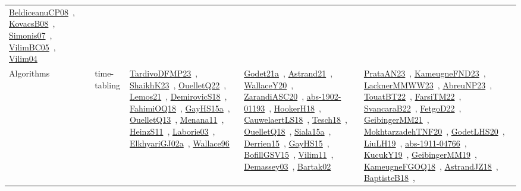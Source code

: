 {\begin{longtable}{lp{3cm}>{\raggedright\arraybackslash}p{6cm}>{\raggedright\arraybackslash}p{6cm}>{\raggedright\arraybackslash}p{8cm}}
\href{works/BeldiceanuCP08.pdf}{BeldiceanuCP08}~\cite{BeldiceanuCP08}, \href{works/KovacsB08.pdf}{KovacsB08}~\cite{KovacsB08}, \href{works/Simonis07.pdf}{Simonis07}~\cite{Simonis07}, \href{works/VilimBC05.pdf}{VilimBC05}~\cite{VilimBC05}, \href{works/Vilim04.pdf}{Vilim04}~\cite{Vilim04}\\
Algorithms & time-tabling & \href{works/TardivoDFMP23.pdf}{TardivoDFMP23}~\cite{TardivoDFMP23}, \href{works/ShaikhK23.pdf}{ShaikhK23}~\cite{ShaikhK23}, \href{works/OuelletQ22.pdf}{OuelletQ22}~\cite{OuelletQ22}, \href{works/Lemos21.pdf}{Lemos21}~\cite{Lemos21}, \href{works/DemirovicS18.pdf}{DemirovicS18}~\cite{DemirovicS18}, \href{works/FahimiOQ18.pdf}{FahimiOQ18}~\cite{FahimiOQ18}, \href{works/GayHS15a.pdf}{GayHS15a}~\cite{GayHS15a}, \href{works/OuelletQ13.pdf}{OuelletQ13}~\cite{OuelletQ13}, \href{works/Menana11.pdf}{Menana11}~\cite{Menana11}, \href{works/HeinzS11.pdf}{HeinzS11}~\cite{HeinzS11}, \href{works/Laborie03.pdf}{Laborie03}~\cite{Laborie03}, \href{works/ElkhyariGJ02a.pdf}{ElkhyariGJ02a}~\cite{ElkhyariGJ02a}, \href{works/Wallace96.pdf}{Wallace96}~\cite{Wallace96} & \href{works/Godet21a.pdf}{Godet21a}~\cite{Godet21a}, \href{works/Astrand21.pdf}{Astrand21}~\cite{Astrand21}, \href{works/WallaceY20.pdf}{WallaceY20}~\cite{WallaceY20}, \href{works/ZarandiASC20.pdf}{ZarandiASC20}~\cite{ZarandiASC20}, \href{works/abs-1902-01193.pdf}{abs-1902-01193}~\cite{abs-1902-01193}, \href{works/HookerH18.pdf}{HookerH18}~\cite{HookerH18}, \href{works/CauwelaertLS18.pdf}{CauwelaertLS18}~\cite{CauwelaertLS18}, \href{works/Tesch18.pdf}{Tesch18}~\cite{Tesch18}, \href{works/OuelletQ18.pdf}{OuelletQ18}~\cite{OuelletQ18}, \href{works/Siala15a.pdf}{Siala15a}~\cite{Siala15a}, \href{works/Derrien15.pdf}{Derrien15}~\cite{Derrien15}, \href{works/GayHS15.pdf}{GayHS15}~\cite{GayHS15}, \href{works/BofillGSV15.pdf}{BofillGSV15}~\cite{BofillGSV15}, \href{works/Vilim11.pdf}{Vilim11}~\cite{Vilim11}, \href{works/Demassey03.pdf}{Demassey03}~\cite{Demassey03}, \href{works/Bartak02.pdf}{Bartak02}~\cite{Bartak02} & \href{works/PrataAN23.pdf}{PrataAN23}~\cite{PrataAN23}, \href{works/KameugneFND23.pdf}{KameugneFND23}~\cite{KameugneFND23}, \href{works/LacknerMMWW23.pdf}{LacknerMMWW23}~\cite{LacknerMMWW23}, \href{works/AbreuNP23.pdf}{AbreuNP23}~\cite{AbreuNP23}, \href{works/TouatBT22.pdf}{TouatBT22}~\cite{TouatBT22}, \href{works/FarsiTM22.pdf}{FarsiTM22}~\cite{FarsiTM22}, \href{works/SvancaraB22.pdf}{SvancaraB22}~\cite{SvancaraB22}, \href{works/FetgoD22.pdf}{FetgoD22}~\cite{FetgoD22}, \href{works/GeibingerMM21.pdf}{GeibingerMM21}~\cite{GeibingerMM21}, \href{works/MokhtarzadehTNF20.pdf}{MokhtarzadehTNF20}~\cite{MokhtarzadehTNF20}, \href{works/GodetLHS20.pdf}{GodetLHS20}~\cite{GodetLHS20}, \href{works/LiuLH19.pdf}{LiuLH19}~\cite{LiuLH19}, \href{works/abs-1911-04766.pdf}{abs-1911-04766}~\cite{abs-1911-04766}, \href{works/KucukY19.pdf}{KucukY19}~\cite{KucukY19}, \href{works/GeibingerMM19.pdf}{GeibingerMM19}~\cite{GeibingerMM19}, \href{works/KameugneFGOQ18.pdf}{KameugneFGOQ18}~\cite{KameugneFGOQ18}, \href{works/AstrandJZ18.pdf}{AstrandJZ18}~\cite{AstrandJZ18}, \href{works/BaptisteB18.pdf}{BaptisteB18}~\cite{BaptisteB18}, 
\end{longtable}}
